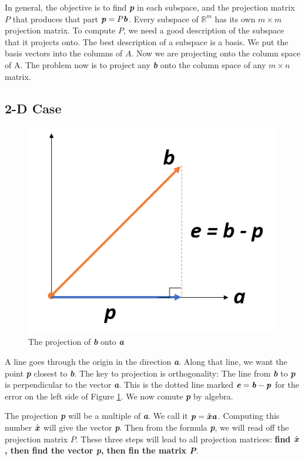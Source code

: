 \documentclass[12pt, letterpaper]{article}
\newcommand{\R}[1]{$\mathbb{R}^{#1}$}
\newcommand{\V}[1]{\textbf{\textit{#1}}}
\theoremstyle{definition}
\begin{document}
	
	
	In general, the objective is to find \V{p} in each subspace, and the projection matrix $P$ that produces that part $\V{p} = P\V{b}$. Every subspace of \R{m} has its own $m\times m$ projection matrix. To compute $P$, we need a good description of the subspace that it projects onto. The best description of a subspace is a basis. We put the basis vectors into the columns of $A$. Now we are projecting onto the column space of A. The problem now is to project any \V{b} onto the column space of any $m \times n$ matrix.
	
	
\subsection{2-D Case}
		\begin{figure}[h!]
			\centering
			\includegraphics[scale=0.5]{projection_2D.png}
			\caption{The projection of \V{b} onto \V{a}}
			\label{projection2D}
		\end{figure}
	
	A line goes through the origin in the direction \V{a}. Along that line, we want the point \V{p} closest to \V{b}. The key to projection is orthogonality: The line from \V{b} to \V{p} is perpendicular to the vector \V{a}. This is the dotted line marked $\V{e} = \V{b} - \V{p}$ for the error on the left side of Figure \ref{projection2D}. We now comute \V{p} by algebra. 
	
	The projection \V{p} will be a multiple of \V{a}. We call it $\V{p} = \hat{\V{x}} \V{a}$. Computing this number $\hat{\V{x}}$ will give the vector \V{p}. Then from the formula \V{p}, we will read off the projection matrix $P$. These three steps will lead to all projection matrices: \textbf{find $\hat{\V{x}}$, then find the vector \V{p}, then fin the matrix \V{P}}.
\end{document}
